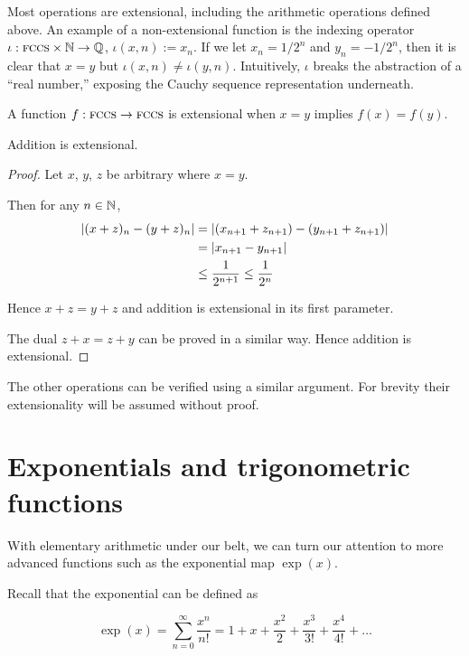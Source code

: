 \documentclass[leqno]{report}
\begin{document}
Most operations are extensional, including the arithmetic operations defined above. An example of a non-extensional function is the indexing operator $\iota : \textsc{fccs} \times \mathbb{N} \rightarrow \mathbb{Q}$, $\iota(x, n) := x_n$. If we let $x_n = 1/2^n$ and $y_n = -1/2^n$, then it is clear that $x = y$ but $\iota(x, n) \neq \iota(y, n)$. Intuitively, $\iota$ breaks the abstraction of a ``real number,'' exposing the Cauchy sequence representation underneath.

\begin{Definition}[Extensionality]
    A function $f : \textsc{fccs} \rightarrow \textsc{fccs}$ is extensional when $x = y$ implies $f(x) = f(y)$.
\end{Definition}

\begin{Proposition}
    Addition is extensional.
\end{Proposition}

\begin{proof}
    Let $x$, $y$, $z$ be arbitrary \FCCS{} where $x = y$.

    Then for any $n \in \mathbb{N}$,
    \begin{align*}
        \left|  (x + z)_n - (y + z)_n  \right|
        &= \left|  (x_{n+1} + z_{n+1}) - (y_{n+1} + z_{n+1})  \right| \\
        &= \left|  x_{n+1} - y_{n+1}  \right| \\
        &\leq \frac{1}{2^{n+1}} \leq \frac{1}{2^n}
    \end{align*}

    Hence $x + z = y + z$ and addition is extensional in its first parameter.

    The dual $z + x = z + y$ can be proved in a similar way. Hence addition is extensional.
\end{proof}

The other operations can be verified using a similar argument. For brevity their extensionality will be assumed without proof.

\section{Exponentials and trigonometric functions}

With elementary arithmetic under our belt, we can turn our attention to more advanced functions such as the exponential map $\exp(x)$.

Recall that the exponential can be defined as

\[
    \exp(x) = \sum_{n=0}^\infty \frac{x^n}{n!}
    = 1 + x + \frac{x^2}{2} + \frac{x^3}{3!} + \frac{x^4}{4!} + \ldots
\]
\end{document}
